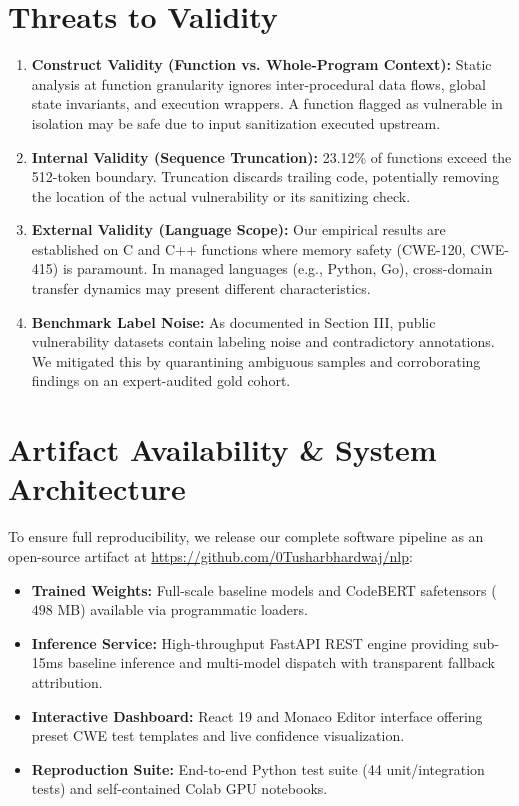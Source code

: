 \documentclass[conference]{IEEEtran}
\begin{document}
\section{Threats to Validity}

\begin{enumerate}
    \item \textbf{Construct Validity (Function vs. Whole-Program Context):} Static analysis at function granularity ignores inter-procedural data flows, global state invariants, and execution wrappers. A function flagged as vulnerable in isolation may be safe due to input sanitization executed upstream.
    \item \textbf{Internal Validity (Sequence Truncation):} 23.12\% of functions exceed the 512-token boundary. Truncation discards trailing code, potentially removing the location of the actual vulnerability or its sanitizing check.
    \item \textbf{External Validity (Language Scope):} Our empirical results are established on C and C++ functions where memory safety (CWE-120, CWE-415) is paramount. In managed languages (e.g., Python, Go), cross-domain transfer dynamics may present different characteristics.
    \item \textbf{Benchmark Label Noise:} As documented in Section III, public vulnerability datasets contain labeling noise and contradictory annotations. We mitigated this by quarantining ambiguous samples and corroborating findings on an expert-audited gold cohort.
\end{enumerate}

\section{Artifact Availability \& System Architecture}

To ensure full reproducibility, we release our complete software pipeline as an open-source artifact at \url{https://github.com/0Tusharbhardwaj/nlp}:
\begin{itemize}
    \item \textbf{Trained Weights:} Full-scale baseline models and CodeBERT safetensors ($498$ MB) available via programmatic loaders.
    \item \textbf{Inference Service:} High-throughput FastAPI REST engine providing sub-15ms baseline inference and multi-model dispatch with transparent fallback attribution.
    \item \textbf{Interactive Dashboard:} React 19 and Monaco Editor interface offering preset CWE test templates and live confidence visualization.
    \item \textbf{Reproduction Suite:} End-to-end Python test suite (44 unit/integration tests) and self-contained Colab GPU notebooks.
\end{itemize}
\end{document}
